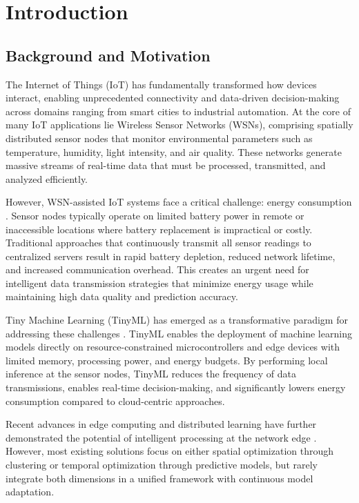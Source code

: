 \documentclass[12pt,a4paper]{article}
\begin{document}
\clearpage
\section{Introduction}

\subsection{Background and Motivation}
The Internet of Things (IoT) has fundamentally transformed how devices interact, enabling unprecedented connectivity and data-driven decision-making across domains ranging from smart cities to industrial automation. At the core of many IoT applications lie Wireless Sensor Networks (WSNs), comprising spatially distributed sensor nodes that monitor environmental parameters such as temperature, humidity, light intensity, and air quality. These networks generate massive streams of real-time data that must be processed, transmitted, and analyzed efficiently.

However, WSN-assisted IoT systems face a critical challenge: energy consumption \cite{Ahmed2023WSNEnergy}. Sensor nodes typically operate on limited battery power in remote or inaccessible locations where battery replacement is impractical or costly. Traditional approaches that continuously transmit all sensor readings to centralized servers result in rapid battery depletion, reduced network lifetime, and increased communication overhead. This creates an urgent need for intelligent data transmission strategies that minimize energy usage while maintaining high data quality and prediction accuracy.

Tiny Machine Learning (TinyML) has emerged as a transformative paradigm for addressing these challenges \cite{Ray2022TinyMLDeployment, Sakr2024TinyMLApplications}. TinyML enables the deployment of machine learning models directly on resource-constrained microcontrollers and edge devices with limited memory, processing power, and energy budgets. By performing local inference at the sensor nodes, TinyML reduces the frequency of data transmissions, enables real-time decision-making, and significantly lowers energy consumption compared to cloud-centric approaches.

Recent advances in edge computing and distributed learning have further demonstrated the potential of intelligent processing at the network edge \cite{Wang2023EdgeAI, Zhang2024FederatedEdge}. However, most existing solutions focus on either spatial optimization through clustering or temporal optimization through predictive models, but rarely integrate both dimensions in a unified framework with continuous model adaptation.
\end{document}
